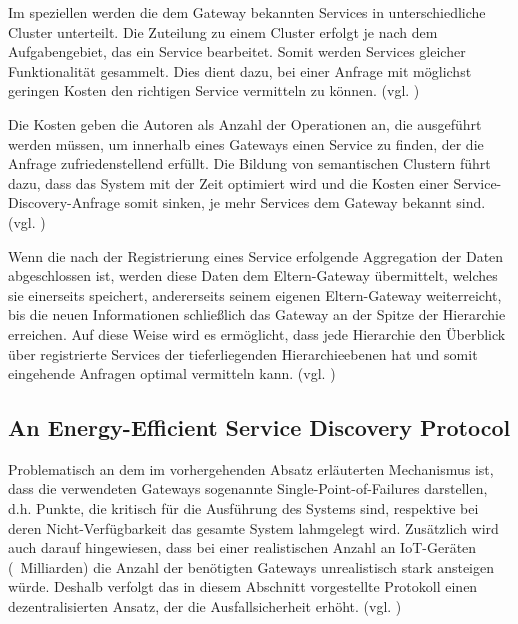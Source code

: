 \documentclass[conference,compsoc]{IEEEtran}
\begin{document}
Im speziellen werden die dem Gateway bekannten Services in unterschiedliche Cluster unterteilt. Die Zuteilung zu einem Cluster erfolgt je nach dem Aufgabengebiet, das ein Service bearbeitet. Somit werden Services gleicher Funktionalität gesammelt. Dies dient dazu, bei einer Anfrage mit möglichst geringen Kosten den richtigen Service vermitteln zu können. (vgl. \cite{efficientSemantic})

Die Kosten geben die Autoren als Anzahl der Operationen an, die ausgeführt werden müssen, um innerhalb eines Gateways einen Service zu finden, der die Anfrage zufriedenstellend erfüllt. Die Bildung von semantischen Clustern führt dazu, dass das System mit der Zeit optimiert wird und die Kosten einer Service-Discovery-Anfrage somit sinken, je mehr Services dem Gateway bekannt sind. (vgl. \cite{efficientSemantic})

Wenn die nach der Registrierung eines Service erfolgende Aggregation der Daten abgeschlossen ist, werden diese Daten dem Eltern-Gateway übermittelt, welches sie einerseits speichert, andererseits seinem eigenen Eltern-Gateway weiterreicht, bis die neuen Informationen schließlich das Gateway an der Spitze der Hierarchie erreichen. Auf diese Weise wird es ermöglicht, dass jede Hierarchie den Überblick über registrierte Services der tieferliegenden Hierarchieebenen hat und somit eingehende Anfragen optimal vermitteln kann. (vgl. \cite{efficientSemantic})

\subsection{An Energy-Efficient Service Discovery Protocol}

Problematisch an dem im vorhergehenden Absatz erläuterten Mechanismus ist, dass die verwendeten Gateways sogenannte Single-Point-of-Failures darstellen, d.h. Punkte, die kritisch für die Ausführung des Systems sind, respektive bei deren Nicht-Verfügbarkeit das gesamte System lahmgelegt wird. Zusätzlich wird auch darauf hingewiesen, dass bei einer realistischen Anzahl an IoT-Geräten (~Milliarden) die Anzahl der benötigten Gateways unrealistisch stark ansteigen würde. Deshalb verfolgt das in diesem Abschnitt vorgestellte Protokoll einen dezentralisierten Ansatz, der die Ausfallsicherheit erhöht. (vgl. \cite{energy-efficient})
\end{document}
